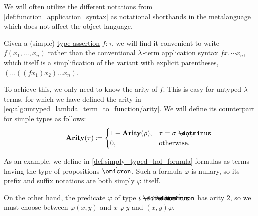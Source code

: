 \begin{remark}\label{rem:simple_type_function_syntax}
  We will often utilize the different notations from \cref{def:function_application_syntax} as notational shorthands in the \hyperref[con:metalogic]{metalanguage} which does not affect the object language.

  Given a (simple) \hyperref[con:type_annotation]{type assertion} \( f: \tau \), we will find it convenient to write \( f(x_1, \ldots, x_n) \) rather than the conventional \( {\mathrm \lambda} \)-term application syntax \( f x_1 \cdots x_n \), which itself is a simplification of the variant with explicit parentheses, \( (\ldots ((f x_1) x_2) \ldots x_n) \).

  To achieve this, we only need to know the arity of \( f \). This is easy for untyped \( {\mathrm \lambda} \)-terms, for which we have defined the arity in \eqref{eq:alg:untyped_lambda_term_to_function/arity}. We will define its counterpart for \hyperref[def:simple_type]{simple types} as follows:
  \begin{equation*}
    \op*{Arity}(\tau) \coloneqq \begin{cases}
      1 + \op*{Arity}(\rho), &\tau = \sigma \synimplies \rho, \\
      0,                     &\T{otherwise.}
    \end{cases}
  \end{equation*}

  As an example, we define in \cref{def:simply_typed_hol_formula} formulas as terms having the type of propositions \( \syn\omicron \). Such a formula \( \varphi \) is nullary, so its prefix and suffix notations are both simply \( \varphi \) itself.

  On the other hand, the predicate \( \varphi \) of type \( \syn\iota \synimplies \syn\iota \synimplies \syn\omicron \) has arity \( 2 \), so we must choose between \( \varphi(x, y) \) and \( x \mathbin{\varphi} y \) and \( (x, y)\varphi \).
\end{remark}

